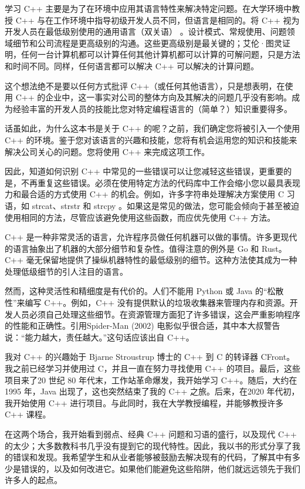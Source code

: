 ﻿学习 C++ 主要是为了在环境中应用其语言特性来解决特定问题。在大学环境中教授 C++ 与在工作环境中指导初级开发人员不同，但语言是相同的。将 C++ 视为开发人员在最低级别使用的通用语言（双关语） 。设计模式、常规使用、问题领域细节和公司流程是更高级别的沟通。这些更高级别是最关键的；艾伦·图灵证明，任何一台计算机都可以计算任何其他计算机都可以计算的可解问题，只是方法和时间不同。同样，任何语言都可以解决 C++ 可以解决的计算问题。

这个想法绝不是要以任何方式批评 C++（或任何其他语言），只是想表明，在使用 C++ 的企业中，这一事实对公司的整体方向及其解决的问题几乎没有影响。成为经验丰富的开发人员的技能比您对特定编程语言的（简单？）知识重要得多。

话虽如此，为什么这本书是关于 C++ 的呢？之前，我们确定您将被引入一个使用 C++ 的环境。鉴于您对该语言的兴趣和技能，您将有机会运用您的知识和技能来解决公司关心的问题。您将使用 C++ 来完成这项工作。

因此，知道如何识别 C++ 中常见的一些错误可以让您减轻这些错误，更重要的是，不再重复这些错误。必须在使用特定方法的代码库中工作会缩小您以最具表现力和最合适的方式使用 C++ 的机会。例如，许多字符串处理解决方案使用 C 习语，如 strcat、strstr 和 strcpy 。如果这是常见的做法，您可能会倾向于甚至被迫使用相同的方法，尽管应该避免使用这些函数，而应优先使用 C++ 方法。

C++ 是一种非常灵活的语言，允许程序员做任何机器可以做的事情。许多更现代的语言抽象出了机器的大部分细节和复杂性。值得注意的例外是 Go 和 Rust。C++ 毫无保留地提供了操纵机器特性的最低级别的细节。这种方法使其成为一种处理低级细节的引人注目的语言。

然而，这种灵活性和精细度是有代价的。人们不能用 Python 或 Java 的“松散性”来编写 C++。例如，C++ 没有提供默认的垃圾收集器来管理内存和资源。开发人员必须自己处理这些细节。在资源管理方面犯了许多错误，这会严重影响程序的性能和正确性。引用Spider-Man (2002) 电影似乎很合适，其中本大叔警告说：“能力越大，责任越大。”这句话应该出自 C++。

我对 C++ 的兴趣始于 Bjarne Stroustrup 博士的 C++ 到 C 的转译器 CFront。我之前已经学习并使用过 C，并且一直在努力寻找使用 C++ 的项目。最后，这些项目来了20 世纪 80 年代末，工作站革命爆发，我开始学习 C++。随后，大约在 1995 年，Java 出现了，这也突然结束了我的 C++ 之旅。后来，在2020 年代初，我开始使用 C++ 进行项目。与此同时，我在大学教授编程，并能够教授许多 C++ 课程。

在这两个场合，我开始看到弱点、经典 C++ 问题和习语的盛行，以及现代 C++ 的太少；大多数教科书几乎没有提到它的现代特性。因此，我以书的形式分享了我的错误和发现。我希望学生和从业者能够被鼓励去解决现有的代码，了解其中有多少是错误的，以及如何改进它。如果他们能避免这些陷阱，他们就远远领先于我们许多人的起点。
